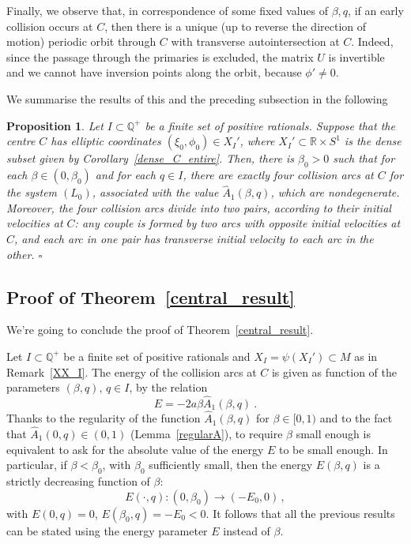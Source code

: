 \documentclass[a4paper]{article}
\newtheorem{proposition}{Proposition}
\begin{document}
Finally, we observe that, in correspondence of some fixed values of
$\beta, q$, if an early collision occurs at $C$, then there is a
unique (up to reverse the direction of motion) periodic orbit through
$C$ with transverse autointersection at $C$. Indeed, since the passage
through the primaries is excluded, the matrix $U$ is invertible and we
cannot have inversion points along the orbit, because $\phi' \neq 0$.

We summarise the results of this and the preceding subsection in the
following
\begin{proposition}
\label{transversality}
Let $I \subset {\mathbb{Q}}^+$ be a finite set of positive rationals.  Suppose
that the centre $C$ has elliptic coordinates $(\xi_0,\phi_0) \in
X_I'$, where $X_I' \subset {\mathbb{R}}\times S^1$ is the dense subset given by
Corollary~\ref{dense_C_entire}. Then, there is $\beta_0>0$ such that
for each $\beta \in (0,\beta_0)$ and for each $q \in I$, there are
exactly four collision arcs at $C$ for the system $(L_0)$, associated
with the value $\hat{A}_1(\beta,q)$, which are nondegenerate.
Moreover, the four collision arcs divide into two pairs, according to
their initial velocities at $C$: any couple is formed by two arcs with
opposite initial velocities at $C$, and each arc in one pair has
transverse initial velocity to each arc in the other.  {$\square$\\}
\end{proposition}

\subsection{Proof of Theorem~\ref{central_result}}
\label{final_proof}
We're going to conclude the proof of Theorem~\ref{central_result}.

Let $I \subset {\mathbb{Q}}^+$ be a finite set of positive rationals and  
$X_I=\psi(X_I')\subset M$ as in Remark~\ref{XX_I}.
The energy of the collision arcs at $C$ is given as function of the parameters 
$(\beta,q)$, $q \in I$, by the relation
\[
E=-2a \beta \hat{A}_1(\beta,q)\ .
\]
Thanks to the regularity of the function $\hat{A}_1(\beta,q)$ for 
$\beta \in [0,1)$ and to the fact that $\hat{A}_1(0,q)\in (0,1)$ 
(Lemma~\ref{regularA}), to require $\beta$ small enough is equivalent to ask 
for the absolute value of the energy $E$ to be small enough. In particular, 
if $\beta<\beta_0$, with $\beta_0$ sufficiently small, then the energy 
$E(\beta,q)$ is a strictly decreasing function of $\beta$: 
\[
E(\cdot,q):(0,\beta_0) \rightarrow (-E_0,0)\,,
\] 
with $E(0,q)=0$, $E(\beta_0,q)=-E_0<0$.  It follows that all the
previous results can be stated using the energy parameter $E$ instead
of $\beta$.
\end{document}

